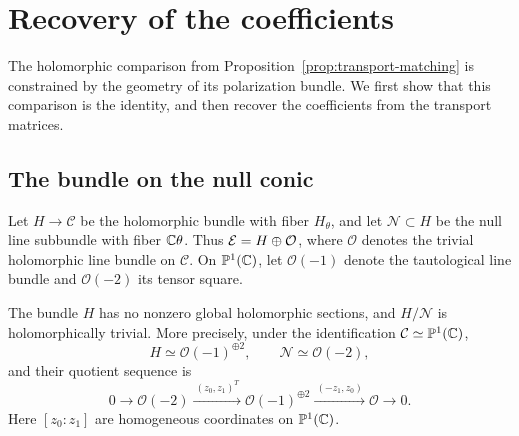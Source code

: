 \section{Recovery of the coefficients}\label{sec:coefficient-recovery}

The holomorphic comparison from Proposition~\ref{prop:transport-matching}
is constrained by the geometry of its polarization bundle.  We first show
that this comparison is the identity, and then recover the coefficients from
the transport matrices.

\subsection{The bundle on the null conic}

Let $H\to\mathcal C$ be the holomorphic bundle with fiber $H_\theta$, and
let $\mathcal N\subset H$ be the null line subbundle with fiber
$\mathbb C\theta$.  Thus $\mathcal E=H\oplus\mathcal O$, where $\mathcal O$ denotes
the trivial holomorphic line bundle on $\mathcal C$.
On $\mathbb P^1(\mathbb C)$, let $\mathcal O(-1)$ denote the tautological line
bundle and $\mathcal O(-2)$ its tensor square.

\begin{lemma}\label{lem:conic-bundle}
The bundle $H$ has no nonzero global holomorphic sections, and
$H/\mathcal N$ is holomorphically trivial.  More precisely, under the
identification $\mathcal C\simeq\mathbb P^1(\mathbb C)$,
\[
 H\simeq\mathcal O(-1)^{\oplus2},\qquad
 \mathcal N\simeq\mathcal O(-2),
\]
and their quotient sequence is
\begin{equation}\label{eq:conic-quotient}
 0\longrightarrow\mathcal O(-2)
 \xrightarrow{\ (z_0,z_1)^T\ }
 \mathcal O(-1)^{\oplus2}
 \xrightarrow{\ (-z_1,z_0)\ }
 \mathcal O\longrightarrow0.
\end{equation}
Here $[z_0:z_1]$ are homogeneous coordinates on $\mathbb P^1(\mathbb C)$.
\end{lemma}

